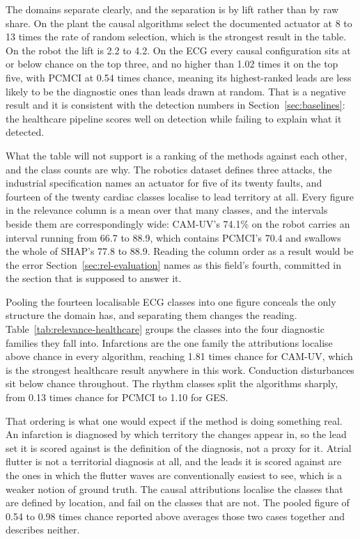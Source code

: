 

The domains separate clearly, and the separation is by lift rather than by raw share. On the plant the causal algorithms select the documented actuator at 8 to 13 times the rate of random selection, which is the strongest result in the table. On the robot the lift is 2.2 to 4.2. On the ECG every causal configuration sits at or below chance on the top three, and no higher than 1.02 times it on the top five, with PCMCI at 0.54 times chance, meaning its highest-ranked leads are less likely to be the diagnostic ones than leads drawn at random. That is a negative result and it is consistent with the detection numbers in Section~\ref{sec:baselines}: the healthcare pipeline scores well on detection while failing to explain what it detected.

What the table will not support is a ranking of the methods against each other, and the class counts are why. The robotics dataset defines three attacks, the industrial specification names an actuator for five of its twenty faults, and fourteen of the twenty cardiac classes localise to lead territory at all. Every figure in the relevance column is a mean over that many classes, and the intervals beside them are correspondingly wide: CAM-UV's 74.1\% on the robot carries an interval running from 66.7 to 88.9, which contains PCMCI's 70.4 and swallows the whole of SHAP's 77.8 to 88.9. Reading the column order as a result would be the error Section~\ref{sec:rel-evaluation} names as this field's fourth, committed in the section that is supposed to answer it.

Pooling the fourteen localisable ECG classes into one figure conceals the only
structure the domain has, and separating them changes the reading.
Table~\ref{tab:relevance-healthcare} groups the classes into the four diagnostic
families they fall into. Infarctions are the one family the attributions
localise above chance in every algorithm, reaching 1.81 times chance for CAM-UV,
which is the strongest healthcare result anywhere in this work. Conduction
disturbances sit below chance throughout. The rhythm classes split the
algorithms sharply, from 0.13 times chance for PCMCI to 1.10 for GES.

That ordering is what one would expect if the method is doing something real.
An infarction is diagnosed by which territory the changes appear in, so the
lead set it is scored against is the definition of the diagnosis, not a
proxy for it. Atrial flutter is not a territorial diagnosis at all, and the
leads it is scored against are the ones in which the flutter waves are
conventionally easiest to see, which is a weaker notion of ground truth. The
causal attributions localise the classes that are defined by location, and fail
on the classes that are not. The pooled figure of 0.54 to 0.98 times chance
reported above averages those two cases together and describes neither.

